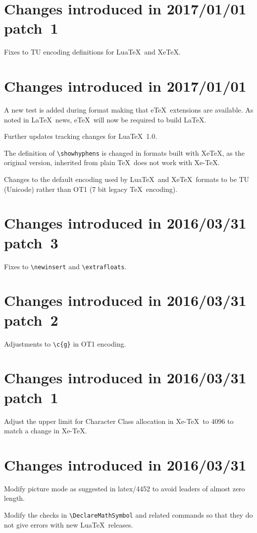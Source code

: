 \documentclass{ltxguide}
\begin{document}
\section{Changes  introduced in 2017/01/01 patch~1}
Fixes to TU encoding definitions for Lua\TeX\ and Xe\TeX.

\section{Changes  introduced in 2017/01/01}

A new test is added during format making that e\TeX\ extensions are
available. As noted in \LaTeX\ news, e\TeX\ will now be required to
build \LaTeX.
 
Further updates tracking changes for Lua\TeX~1.0.

The definition of \verb|\showhyphens| is changed in formats built
with Xe\TeX, as the original version, inherited from plain \TeX\ does
not work with Xe-\TeX.

Changes to the default encoding used by Lua\TeX\ and Xe\TeX\ formats to
be TU (Unicode) rather than OT1 (7 bit legacy \TeX\ encoding).

\section{Changes  introduced in 2016/03/31 patch~3}
Fixes to \verb|\newinsert| and \verb|\extrafloats|.

\section{Changes  introduced in 2016/03/31 patch~2}
Adjustments to \verb|\c{g}| in OT1 encoding.

\section{Changes  introduced in 2016/03/31 patch~1}
Adjust the upper limit for Character Class allocation in Xe-\TeX\ to
4096 to match a change in Xe-\TeX.

\section{Changes  introduced in 2016/03/31}
Modify picture mode as suggested in latex/4452 to avoid leaders of
almost zero length.

Modify the checks in \verb|\DeclareMathSymbol| and related commands
so that they do not give errors with new Lua\TeX\ releases.
\end{document}
